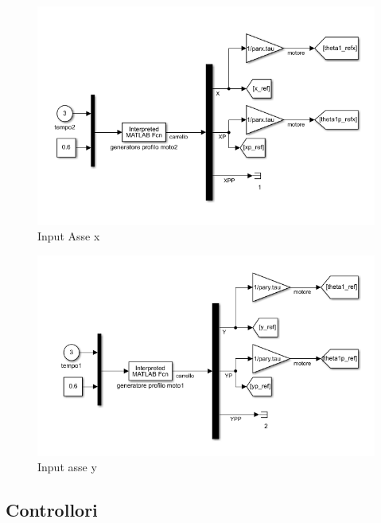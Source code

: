 \documentclass{article}
\begin{document}

\begin{figure}[H]
\centering
\includegraphics[width=.6\textwidth]{./simulink/ldm_variabile/PIDX_FUNZIONE}
\caption{Input Asse x}
\end{figure}

\begin{figure}[H]
\centering
\includegraphics[width=.6\textwidth]{./simulink/ldm_variabile/PIDY_FUNZIONE}
\caption{Input asse y}
\end{figure}

\subsection{Controllori}
\end{document}
